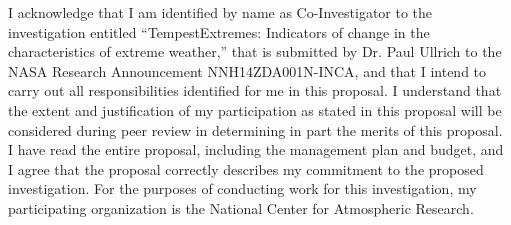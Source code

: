 \documentclass[10pt,stdletter,dateno,sigleft]{newlfm}
\begin{document}
\begin{newlfm}


I acknowledge that I am identified by name as Co-Investigator to the investigation entitled ``TempestExtremes: Indicators of change in the characteristics of extreme weather,'' that is submitted by Dr. Paul Ullrich to the NASA Research Announcement NNH14ZDA001N-INCA, and that I intend to carry out all responsibilities identified for me in this proposal. I understand that the extent and justification of my participation as stated in this proposal will be considered during peer review in determining in part the merits of this proposal. I have read the entire proposal, including the management plan and budget, and I agree that the proposal correctly describes my commitment to the proposed investigation. For the purposes of conducting work for this investigation, my participating organization is the National Center for Atmospheric Research.



\end{newlfm}
\end{document}
